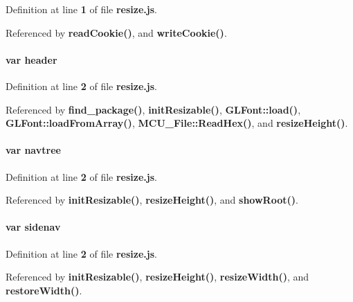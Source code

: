 Definition at line {\bf 1} of file {\bf resize.\+js}.



Referenced by {\bf read\+Cookie()}, and {\bf write\+Cookie()}.

\paragraph[{header}]{\setlength{\rightskip}{0pt plus 5cm}var header}\label{resize_8js_af920c2a7d4f4b5a962fe8e11257f871d}


Definition at line {\bf 2} of file {\bf resize.\+js}.



Referenced by {\bf find\+\_\+package()}, {\bf init\+Resizable()}, {\bf G\+L\+Font\+::load()}, {\bf G\+L\+Font\+::load\+From\+Array()}, {\bf M\+C\+U\+\_\+\+File\+::\+Read\+Hex()}, and {\bf resize\+Height()}.

\paragraph[{navtree}]{\setlength{\rightskip}{0pt plus 5cm}var navtree}\label{resize_8js_a711d37a3374012d4f6060fffe0abea55}


Definition at line {\bf 2} of file {\bf resize.\+js}.



Referenced by {\bf init\+Resizable()}, {\bf resize\+Height()}, and {\bf show\+Root()}.

\paragraph[{sidenav}]{\setlength{\rightskip}{0pt plus 5cm}var sidenav}\label{resize_8js_a9a7b07fe0df5af5957564912e842c0a4}


Definition at line {\bf 2} of file {\bf resize.\+js}.



Referenced by {\bf init\+Resizable()}, {\bf resize\+Height()}, {\bf resize\+Width()}, and {\bf restore\+Width()}.

